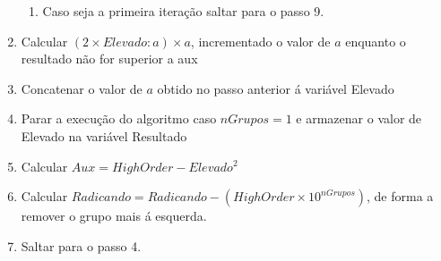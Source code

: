 \begin{enumerate}
\begin{enumerate}
		\item Caso seja a primeira iteração saltar para o passo 9.
	\end{enumerate}
	\item Calcular $(2\times Elevado:a)\times a$, incrementado o valor de $a$ enquanto o resultado não for superior a aux
	\item Concatenar o valor de $a$ obtido no passo anterior á variável Elevado
	\item Parar a execução do algoritmo caso $nGrupos = 1$ e armazenar o valor de Elevado na variável Resultado
	\item Calcular $Aux = HighOrder - Elevado^{2}$ 
	\item Calcular $Radicando = Radicando - (HighOrder\times 10^{nGrupos})$, de forma a remover o grupo mais á esquerda.
	\item Saltar para o passo 4.
\end{enumerate}